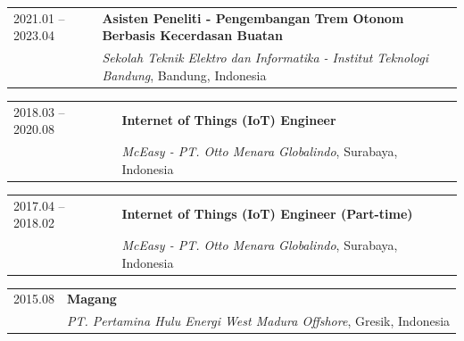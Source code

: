 \noindent
\begin{tabularx}{\linewidth}{@{}l X@{}}
  2021.01 -- 2023.04 & \textbf{Asisten Peneliti - Pengembangan Trem Otonom Berbasis Kecerdasan Buatan} \\
                              & \textit{Sekolah Teknik Elektro dan Informatika - Institut Teknologi Bandung}, Bandung, Indonesia \\
\end{tabularx}\vspace{4pt}

\noindent
\begin{tabularx}{\linewidth}{@{}l X@{}}
  2018.03 -- 2020.08 & \textbf{Internet of Things (IoT) Engineer} \\
                              & \textit{McEasy - PT. Otto Menara Globalindo}, Surabaya, Indonesia \\
\end{tabularx}\vspace{4pt}

\noindent
\begin{tabularx}{\linewidth}{@{}l X@{}}
  2017.04 -- 2018.02 & \textbf{Internet of Things (IoT) Engineer (Part-time)} \\
                              & \textit{McEasy - PT. Otto Menara Globalindo}, Surabaya, Indonesia \\
\end{tabularx}\vspace{4pt}

\noindent
\begin{tabularx}{\linewidth}{@{}l X@{}}
  2015.08\phantom{ -- sekarang} & \textbf{Magang} \\
                                        & \textit{PT. Pertamina Hulu Energi West Madura Offshore}, Gresik, Indonesia \\
\end{tabularx}

